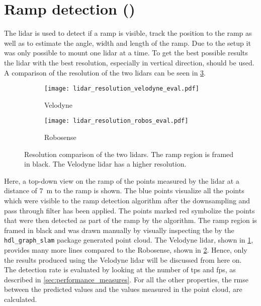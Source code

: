 \section{Ramp detection ()}
The \gls{lidar} is used to detect if a ramp is visible, track the position to the ramp as well as to estimate the angle, width and length of the ramp.
Due to the setup it was only possible to mount one \gls{lidar} at a time.
To get the best possible results the \gls{lidar} with the best resolution, especially in vertical direction, should be used.
A comparison of the resolution of the two \glspl{lidar} can be seen in \cref{fig:lidar_resolution_eval}.
\begin{figure}[htb]
	\centering
	\begin{subfigure}{1\textwidth}
		\centering
		\texttt{[image: lidar\_resolution\_velodyne\_eval.pdf]}
		\caption{Velodyne}
		\label{fig:lidar_resolution_velodyne_eval}
	\end{subfigure}
	
	\begin{subfigure}{1\textwidth}
		\centering
		\texttt{[image: lidar\_resolution\_robos\_eval.pdf]}
		\caption{Robosense}
		\label{fig:lidar_resolution_robos_eval}
	\end{subfigure}
	\caption{Resolution comparison of the two \glspl{lidar}. The ramp region is framed in black. The Velodyne \gls{lidar} has a higher resolution.}
	\label{fig:lidar_resolution_eval}
\end{figure}
Here, a top-down view on the ramp of the points measured by the \gls{lidar} at a distance of \SI{7}{\metre} to the ramp is shown.
The blue points visualize all the points which were visible to the ramp detection algorithm after the downsampling and pass through filter has been applied.
The points marked red symbolize the points that were then detected as part of the ramp by the algorithm.
The ramp region is framed in black and was drawn manually by visually inspecting the by the \texttt{hdl\_graph\_slam} package generated point cloud.
The Velodyne \gls{lidar}, shown in \cref{fig:lidar_resolution_velodyne_eval}, provides many more lines compared to the Robosense, shown in \cref{fig:lidar_resolution_robos_eval}.
Hence, only the results produced using the Velodyne \gls{lidar} will be discussed from here on.\\
The detection rate is evaluated by looking at the number of \glspl{tp} and \glspl{fp}, as described in \cref{sec:performance_measures}.
For all the other properties, the \gls{rmse} between the predicted values and the values measured in the point cloud, are calculated.

